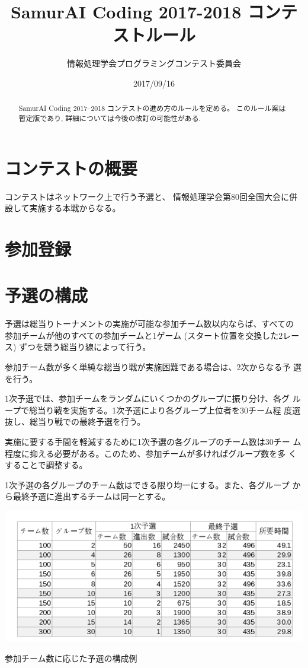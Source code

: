 \documentclass[11pt]{jarticle}
\title{SamurAI Coding 2017-2018 コンテストルール}
\author{情報処理学会プログラミングコンテスト委員会}
\date{2017/09/16}
\begin{document}
\maketitle

\begin{abstract}
  SamurAI Coding 2017--2018 コンテストの進め方のルールを定める。
  このルール案は暫定版であり, 詳細については今後の改訂の可能性がある.
\end{abstract}

\section{コンテストの概要}
コンテストはネットワーク上で行う予選と、
情報処理学会第80回全国大会に併設して実施する本戦からなる。

\section{参加登録}

\section{予選の構成}
予選は総当りトーナメントの実施が可能な参加チーム数以内ならば、すべての
参加チームが他のすべての参加チームと1ゲーム (スタート位置を交換した2レー
ス) ずつを競う総当り線によって行う。

参加チーム数が多く単純な総当り戦が実施困難である場合は、2次からなる予
選を行う。

1次予選では、参加チームをランダムにいくつかのグループに振り分け、各グ
ループで総当り戦を実施する。1次予選により各グループ上位者を30チーム程
度選抜し、総当り戦での最終予選を行う。

実施に要する手間を軽減するために1次予選の各グループのチーム数は30チー
ム程度に抑える必要がある。このため、参加チームが多ければグループ数を多
くすることで調整する。

1次予選の各グループのチーム数はできる限り均一にする。また、各グループ
から最終予選に進出するチームは同一とする。

\begin{table}
\begin{center}
\includegraphics[width=0.8\columnwidth]{preliminary.png}
\caption{参加チーム数に応じた予選の構成例}
\end{center}
\end{table}
\end{document}
